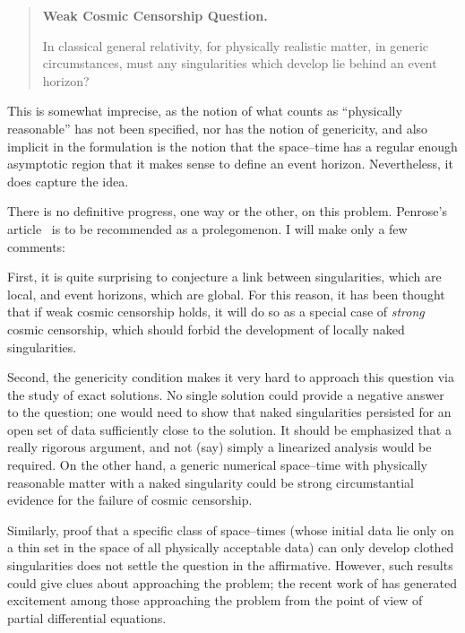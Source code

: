 \documentclass[12pt]{article}
\begin{document}
\begin{quote}
\begin{center}
{\bf Weak Cosmic Censorship Question.}
\end{center}\nobreak
In classical general relativity, for physically realistic matter, in generic circumstances, must any singularities which develop lie behind an event horizon?
\end{quote}

This is somewhat imprecise, as the notion of what counts as ``physically reasonable'' has not been specified, nor has the notion of genericity, and also implicit in the formulation is the notion that the space--time has a regular enough asymptotic region that it makes sense to define an event horizon.  Nevertheless, it does capture the idea.  

There is no definitive progress, one way or the other, on this problem.  Penrose's article~\citep{Penrose:1999} is to be recommended as a prolegomenon.  I will make only a few comments:

First, it is quite surprising to conjecture a link between singularities, which are local, and event horizons, which are global.  For this reason, it has been thought that if weak cosmic censorship holds, it will do so as a special case of {\em strong} cosmic censorship, which should forbid the development of locally naked singularities.

Second, the genericity condition makes it very hard to approach this question via the study of exact solutions.  No single solution could provide a negative answer to the question; one would need to show that naked singularities persisted for an open set of data sufficiently close to the solution.  It should be emphasized that a really rigorous argument, and not (say) simply a linearized analysis would be required.
On the other hand, a generic numerical space--time with physically reasonable matter with a naked singularity could be strong circumstantial evidence for the failure of cosmic censorship.

Similarly, proof that a specific class of space--times (whose initial data lie only on a thin set in the space of all physically acceptable data) can  only develop clothed singularities does not settle the question in the affirmative.  However, such results could give clues about approaching the problem; the recent work of \citet{Ringstrom:2008} has generated excitement among those approaching the problem from the point of view of partial differential equations.
\end{document}
